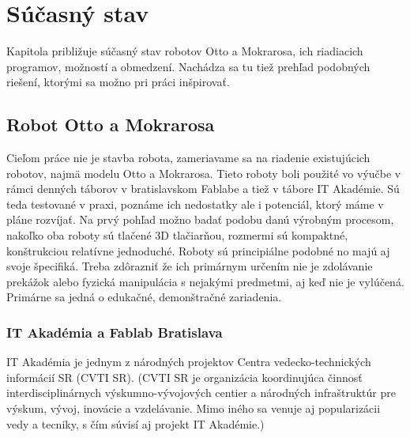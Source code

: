 \chapter{Súčasný stav}

\label{kap:vychodisko}

Kapitola približuje súčasný stav robotov Otto a Mokrarosa, ich riadiacich programov, možností a obmedzení. Nachádza sa tu tiež prehľad podobných riešení, ktorými sa možno pri práci inšpirovať. 

\section{Robot Otto a Mokrarosa}
Cieľom práce nie je stavba robota, zameriavame sa na riadenie existujúcich robotov, najmä modelu Otto a Mokrarosa. Tieto roboty boli použité vo výučbe v rámci denných táborov v bratislavskom Fablabe a tiež v tábore IT Akadémie. Sú teda testované v praxi, poznáme ich nedostatky ale i potenciál, ktorý máme v pláne rozvíjať. Na prvý pohľad možno badať podobu danú výrobným procesom, nakoľko oba roboty sú tlačené 3D tlačiarňou, rozmermi sú kompaktné, konštrukciou relatívne jednoduché. Roboty sú principiálne podobné no majú aj svoje špecifiká. Treba zdôrazniť že ich primárnym určením nie je zdolávanie prekážok alebo fyzická manipulácia s nejakými predmetmi, aj keď nie je vylúčená. Primárne sa jedná o edukačné, demonštračné zariadenia.

\subsection{IT Akadémia a Fablab Bratislava}
IT Akadémia je jednym z národných projektov Centra vedecko-technických informácií SR (CVTI SR). \cite{CVTISR-ITAkademia} (CVTI SR je organizácia koordinujúca činnosť interdisciplinárnych výskumno-vývojových centier a národných infraštruktúr pre výskum, vývoj, inovácie a vzdelávanie. \cite{CVTISR} Mimo iného sa venuje aj popularizácii vedy a tecniky, s čím súvisí aj projekt IT Akadémie.) 

